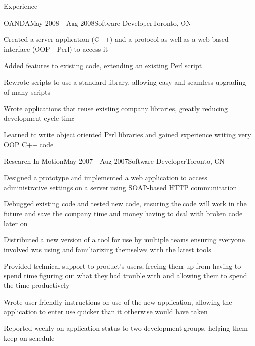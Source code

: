 \documentclass{resume}
\begin{document}
\begin{rSection}{Experience}
    \begin{rSubsection}{OANDA}{May 2008 - Aug 2008}{Software Developer}{Toronto, ON}
      \item Created a server application (C++) and a protocol as well as a web based interface (OOP - Perl) to access it
      \item Added features to existing code, extending an existing Perl script 
      \item Rewrote scripts to use a standard library, allowing easy and seamless upgrading of many scripts
      \item Wrote applications that reuse existing company libraries, greatly reducing development cycle time
      \item Learned to write object oriented Perl libraries and gained experience writing very OOP C++ code
    \end{rSubsection}

    \begin{rSubsection}{Research In Motion}{May 2007 - Aug 2007}{Software Developer}{Toronto, ON}
      \item Designed a prototype and implemented a web application to access administrative settings on a server using SOAP-based HTTP communication
      \item Debugged existing code and tested new code, ensuring the code will work in the future and save the company time and money having to deal with broken code later on
      \item Distributed a new version of a tool for use by multiple teams ensuring everyone involved was using and familiarizing themselves with the latest tools
      \item Provided technical support to product’s users, freeing them up from having to spend time figuring out what they had trouble with and allowing them to spend the time productively
      \item Wrote user friendly instructions on use of the new application, allowing the application to enter use quicker than it otherwise would have taken 
      \item Reported weekly on application status to two development groups, helping them keep on schedule
    \end{rSubsection}

\begin{comment}
    \begin{rSubsection}{Artificial Perception Laboratory (APL)}{May 2007 - Aug 2007}{Team Lead}{Toronto, ON}
      \item Conducted a broad range of projects to help further APL’s research, advancing APLs position in the industry
      \item Led a team of five volunteer students, delivering instructions on a weekly basis and gathering progress reports
      \item Reported weekly to coordinator and other team leaders allowing the different teams to complement each other's productivity
    \end{rSubsection}
\end{comment}


\end{rSection}
\end{document}
